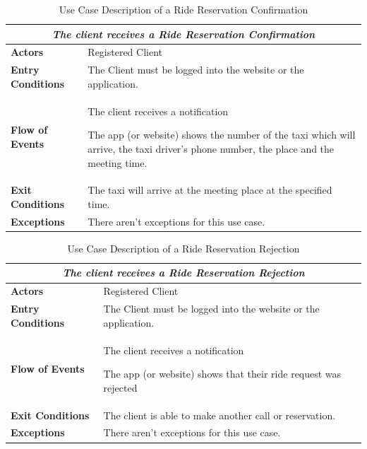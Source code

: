 \documentclass[a4paper]{article}
\begin{document}
\begin{table} [H]
\begin{center}
\begin{tabular}{ |m{}|m{}|  }
\hline
    \multicolumn{2}{|c|}{\textbf{\textit{The client receives a Ride Reservation Confirmation}}} \\
\hline \hline
    \textbf{Actors}
&   Registered Client
\\ \hline
    \textbf{Entry Conditions}
&   The Client must be logged into the website or the application.
\\ \hline
    \textbf{Flow of Events}
& 
    \begin{enumerate*}
    \item The client receives a notification
    \item The app (or website) shows the number of the taxi which will arrive, the taxi driver's phone number, the place and the meeting time.
    \end{enumerate*}
\\ \hline
    \textbf{Exit Conditions}
&   The taxi will arrive at the meeting place at the specified time.
\\ \hline
    \textbf{Exceptions}
&   
    There aren't exceptions for this use case.
\\ \hline
\end{tabular}
\end{center}
\caption{Use Case Description of a Ride Reservation Confirmation}
\label{table:clientrideconfirmation}
\end{table}

\begin{table} [H]
\begin{center}
\begin{tabular}{ |m{}|m{}|  }
\hline
    \multicolumn{2}{|c|}{\textbf{\textit{The client receives a Ride Reservation Rejection}}} \\
\hline \hline
    \textbf{Actors}
&   Registered Client
\\ \hline
    \textbf{Entry Conditions}
&   The Client must be logged into the website or the application.
\\ \hline
    \textbf{Flow of Events}
& 
    \begin{enumerate*}
    \item The client receives a notification
    \item The app (or website) shows that their ride request was rejected
    \end{enumerate*}
\\ \hline
    \textbf{Exit Conditions}
&   The client is able to make another call or reservation.
\\ \hline
    \textbf{Exceptions}
&   
    There aren't exceptions for this use case.
\\ \hline
\end{tabular}
\end{center}
\caption{Use Case Description of a Ride Reservation Rejection}
\label{table:clienridetrejection}
\end{table}
\end{document}
